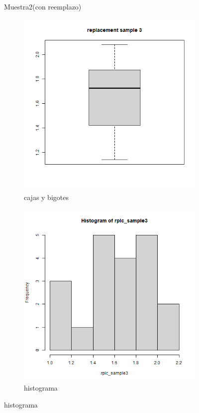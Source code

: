 \documentclass[a4paper,12pt]{article}
\begin{document}
\begin{enumerate}
\begin{figure}[t!]
    
    \caption{Muestra2(con reemplazo)}
    \label{figure}
\end{figure}

\begin{figure}[t!]
    \centering
    \begin{subfigure}[b]{0.4\linewidth}             
        \includegraphics[width = \linewidth]{./datos generados (Ejercicio 1)/replacement_sample3_boxplot.png}
        \caption{cajas y bigotes}
    \end{subfigure}
    \begin{subfigure}[b]{0.4\linewidth}               
        \includegraphics[width = \linewidth]{./datos generados (Ejercicio 1)/replacement_sample3_hist.png}
        \caption{histograma}
    \end{subfigure}


\end{figure}
\end{enumerate}
\end{document}

